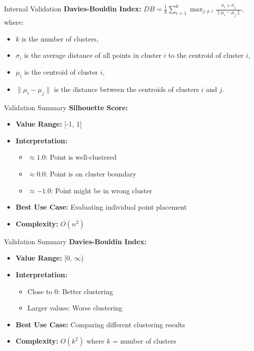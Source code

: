 \documentclass{beamer}
\begin{document}
\begin{frame}{Internal Validation}
    \textbf{Davies-Bouldin Index:}
    $
        DB = \frac{1}{k}\sum_{i=1}^k \max_{j \neq i} \frac{\sigma_i + \sigma_j}{\|\mu_i - \mu_j\|},
    $
    where:
    \begin{itemize}
        \item $k$ is the number of clusters,
        \item $\sigma_i$ is the average distance of all points in cluster $i$ to the centroid of cluster $i$,
        \item $\mu_i$ is the centroid of cluster $i$,
        \item $\|\mu_i - \mu_j\|$ is the distance between the centroids of clusters $i$ and $j$.
    \end{itemize}
\end{frame}
\begin{frame}{Validation Summary}
    \textbf{Silhouette Score:}
    \begin{itemize}
        \item \textbf{Value Range:} [-1, 1]
        \item \textbf{Interpretation:}
        \begin{itemize}
            \item $\approx 1.0$: Point is well-clustered
            \item $\approx 0.0$: Point is on cluster boundary
            \item $\approx -1.0$: Point might be in wrong cluster
        \end{itemize}
        \item \textbf{Best Use Case:} Evaluating individual point placement
        \item \textbf{Complexity:} $O(n^2)$
    \end{itemize}
\end{frame}

\begin{frame}{Validation Summary}
    \textbf{Davies-Bouldin Index:}
    \begin{itemize}
        \item \textbf{Value Range:} [0, $\infty$)
        \item \textbf{Interpretation:}
        \begin{itemize}
            \item Close to 0: Better clustering
            \item Larger values: Worse clustering
        \end{itemize}
        \item \textbf{Best Use Case:} Comparing different clustering results
        \item \textbf{Complexity:} $O(k^2)$ where $k$ = number of clusters
    \end{itemize}
\end{frame}
\end{document}
